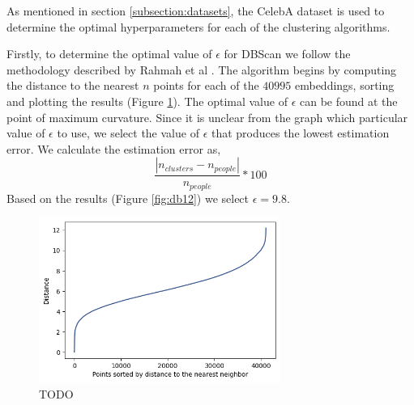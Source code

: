 \documentclass[a4paper,12pt]{report}
\begin{document}
	As mentioned in section \ref{subsection:datasets}, the CelebA dataset is used to determine the optimal hyperparameters for each of the clustering algorithms.
	
	Firstly, to determine the optimal value of $\epsilon$ for DBScan we follow the methodology described by Rahmah et al \cite{rahmah2016determination}. The algorithm begins by computing the distance to the nearest $n$ points for each of the $40995$ embeddings, sorting and plotting the results (Figure \ref{fig:db0}). The optimal value of $\epsilon$ can be found at the point of maximum curvature. Since it is unclear from the graph which particular value of $\epsilon$ to use, we select the value of $\epsilon$ that produces the lowest estimation error. We calculate the estimation error as,
	\[\frac{|n_{clusters} - n_{people}|}{n_{people}} * 100\]
	Based on the results (Figure \ref{fig:db12}) we select $\epsilon=9.8$. 
	
	
	\begin{figure}[htbp]
		\centering
		\includegraphics[width=0.7\textwidth]{images/face/dbscan-parameter-estimation-0.png}
		\caption{TODO}
		\label{fig:db0}
	\end{figure}
	
\end{document}
